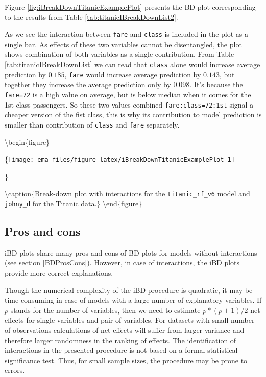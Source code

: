 \documentclass[12pt,]{krantz}
\begin{document}
Figure \ref{fig:iBreakDownTitanicExamplePlot} presents the BD plot corresponding to the results from Table \ref{tab:titanicIBreakDownList2}.

As we see the interaction between \texttt{fare} and \texttt{class} is included in the plot as a single bar. As effects of these two variables cannot be disentangled, the plot shows combination of both variables as a single contribution.
From Table \ref{tab:titanicIBreakDownList} we can read that \texttt{class} alone would increase average prediction by \(0.185\), \texttt{fare} would increase average prediction by \(0.143\), but together they increase the average prediction only by \(0.098\). It's because the \texttt{fare=72} is a high value on average, but is below median when it comes for the 1st class passengers. So these two values combined \texttt{fare:class=72:1st} signal a cheaper version of the fist class, this is why its contribution to model prediction is smaller than contribution of \texttt{class} and \texttt{fare} separately.

\textbackslash{}begin\{figure\}

\{\centering \texttt{[image: ema\_files/figure-latex/iBreakDownTitanicExamplePlot-1]}

\}

\textbackslash{}caption\{Break-down plot with interactions for the \texttt{titanic\_rf\_v6} model and \texttt{johny\_d} for the Titanic data.\}\label{fig:iBreakDownTitanicExamplePlot}
\textbackslash{}end\{figure\}

\hypertarget{iBDProsCons}{%
\subsection{Pros and cons}\label{iBDProsCons}}

iBD plots share many pros and cons of BD plots for models without interactions (see section \ref{BDProsCons}). However, in case of interactions, the iBD plots provide more correct explanations.

Though the numerical complexity of the iBD procedure is quadratic, it may be time-consuming in case of models with a large number of explanatory variables. If \(p\) stands for the number of variables, then we need to estimate \(p*(p+1)/2\) net effects for single variables and pair of variables. For datasets with small number of observations calculations of net effects will suffer from larger variance and therefore larger randomness in the ranking of effects.
The identification of interactions in the presented procedure is not based on a formal statistical significance test. Thus, for small sample sizes, the procedure may be prone to errors.
\end{document}
